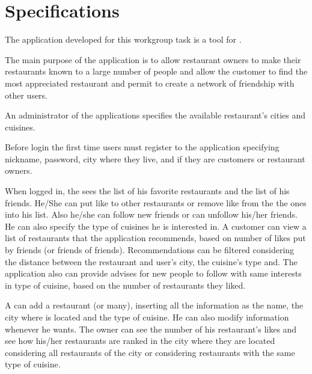 \chapter{Specifications}\label{ch:specs}

The application developed for this workgroup task is a tool for
.

The main purpose of the application is to allow restaurant owners to make their
restaurants known to a large number of people and allow the customer to find
the most appreciated restaurant and permit to create a network of friendship
with other users.

An administrator of the applications specifies the available restaurant's
cities and cuisines.

Before login the first time users must register to the application specifying
nickname, password, city where they live, and if they are customers or
restaurant owners. 

When logged in, the  sees the list of his favorite
restaurants and the list of his friends. He/She can put like to other
restaurants or remove like from the the ones into his list. Also he/she can
follow new friends or can unfollow his/her friends. He can also specify the
type of cuisines he is interested in. A customer can view a list of
restaurants that the application recommends, based on number of likes put by
friends (or friends of friends). Recommendations can be filtered considering
the distance between the restaurant and user's city, the cuisine's type and.
The application also can provide advises for new people to follow with same
interests in type of cuisine, based on the number of restaurants they liked.

A  can add a restaurant (or many), inserting all the
information as the name, the city where is located and the type of cuisine. He
can also modify information whenever he wants. The owner can see the number of
his restaurant's likes and see how his/her restaurants are ranked in the city
where they are located considering all restaurants of the city or considering
restaurants with the same type of cuisine.